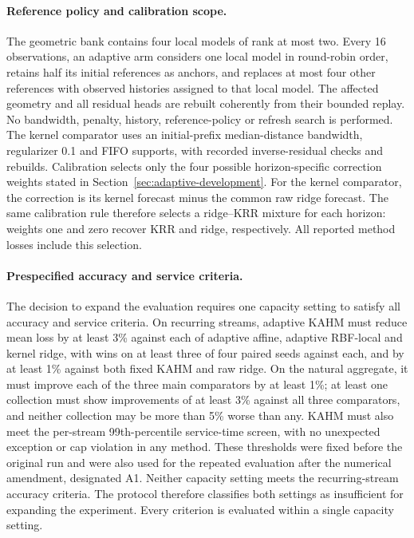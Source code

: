 \paragraph{Reference policy and calibration scope.}
The geometric bank contains four local models of rank at most two. Every
16 observations, an adaptive arm considers one local model in round-robin
order, retains half its initial references as anchors, and replaces at most
four other references with observed histories assigned to that local model.
The affected geometry and all residual heads are rebuilt coherently from
their bounded replay. No bandwidth, penalty, history, reference-policy or
refresh search is performed. The kernel comparator uses an initial-prefix
median-distance bandwidth, regularizer 0.1 and FIFO supports, with recorded
inverse-residual checks and rebuilds. Calibration selects only the four
possible horizon-specific correction weights stated in
Section~\ref{sec:adaptive-development}.
For the kernel comparator, the correction is its kernel forecast minus
the common raw ridge forecast. The same calibration rule therefore selects
a ridge--KRR mixture for each horizon: weights one and zero recover KRR
and ridge, respectively. All reported method losses include this selection.

\paragraph{Prespecified accuracy and service criteria.}
The decision to expand the evaluation requires one capacity setting
to satisfy all accuracy and service criteria. On recurring
streams, adaptive KAHM must reduce mean loss by at least 3\% against each
of adaptive affine, adaptive RBF-local and kernel ridge, with wins on at
least three of four paired seeds against each, and by at least 1\% against
both fixed KAHM and raw ridge. On the natural aggregate, it must improve
each of the three main comparators by at least 1\%; at least one collection must show improvements of at least 3\%
against all three comparators, and neither collection may be more
than 5\% worse than any. KAHM must also meet the per-stream 99th-percentile service-time screen,
with no unexpected exception or cap violation in any method. These
thresholds were fixed before the original run and were also used for
the repeated evaluation after the numerical amendment, designated A1.
Neither capacity setting meets the recurring-stream accuracy criteria.
The protocol therefore classifies both settings as insufficient for
expanding the experiment. Every criterion is evaluated within a single
capacity setting.

